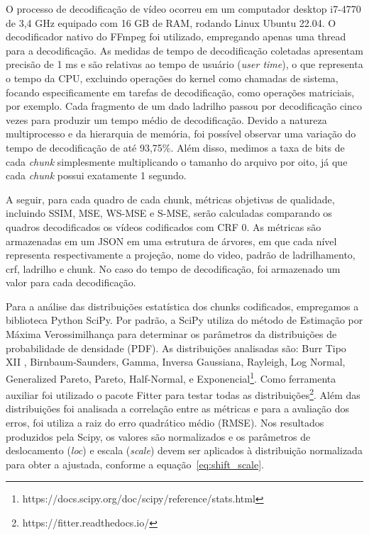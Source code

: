 {O processo de decodificação de vídeo ocorreu em um computador desktop i7-4770 de 3,4 GHz equipado com 16 GB de RAM, rodando Linux Ubuntu 22.04. O decodificador nativo do FFmpeg foi utilizado, empregando apenas uma thread para a decodificação. As medidas de tempo de decodificação coletadas apresentam precisão de 1 ms e são relativas ao tempo de usuário (\textit{user time}), o que representa o tempo da CPU, excluindo operações do kernel como chamadas de sistema, focando especificamente em tarefas de decodificação, como operações matriciais, por exemplo. Cada fragmento de um dado ladrilho passou por decodificação cinco vezes para produzir um tempo médio de decodificação. Devido a natureza multiprocesso e da hierarquia de memória, foi possível observar uma variação do tempo de decodificação de até 93,75\%. Além disso, medimos a taxa de bits de cada \textit{chunk} simplesmente multiplicando o tamanho do arquivo por oito, já que cada \textit{chunk} possui exatamente 1 segundo.

A seguir, para cada quadro de cada chunk, métricas objetivas de qualidade, incluindo SSIM, MSE, WS-MSE e S-MSE, serão calculadas comparando os quadros decodificados os vídeos codificados com CRF 0. As métricas são armazenadas em um JSON em uma estrutura de árvores, em que cada nível representa respectivamente a projeção, nome do video, padrão de ladrilhamento, crf, ladrilho e chunk. No caso do tempo de decodificação, foi armazenado um valor para cada decodificação.

Para a análise das distribuições estatística dos chunks codificados, empregamos a biblioteca Python SciPy. Por padrão, a SciPy utiliza do método de Estimação por Máxima Verossimilhança para determinar os parâmetros da distribuições de probabilidade de densidade (PDF). As distribuições analisadas são: Burr Tipo XII , Birnbaum-Saunders, Gamma, Inversa Gaussiana, Rayleigh, Log Normal, Generalized Pareto, Pareto, Half-Normal, e Exponencial\footnote{https://docs.scipy.org/doc/scipy/reference/stats.html}. Como ferramenta auxiliar foi utilizado o pacote Fitter para testar todas as distribuições\footnote{https://fitter.readthedocs.io/}. Além das distribuições foi analisada a correlação entre as métricas e para a avaliação dos erros, foi utiliza a raiz do erro quadrático médio (RMSE). Nos resultados produzidos pela Scipy, os valores são normalizados e os parâmetros de deslocamento ({\it loc}) e escala ({\it scale}) devem ser aplicados à distribuição normalizada para obter a ajustada, conforme a equação~\ref{eq:shift_scale}.

}
